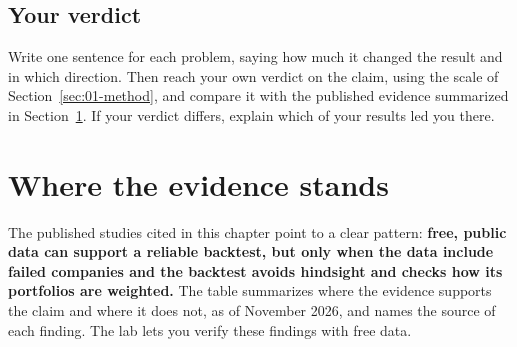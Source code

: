 \subsection*{Your verdict}

Write one sentence for each problem, saying how much it changed the result and in which direction. Then reach your own verdict on the claim, using the scale of Section~\ref{sec:01-method}, and compare it with the published evidence summarized in Section~\ref{sec:02-verdict}. If your verdict differs, explain which of your results led you there.

\section{Where the evidence stands}
\label{sec:02-verdict}

The published studies cited in this chapter point to a clear pattern: \textbf{free, public data can support a reliable backtest, but only when the data include failed companies and the backtest avoids hindsight and checks how its portfolios are weighted.} The table summarizes where the evidence supports the claim and where it does not, as of November 2026, and names the source of each finding. The lab lets you verify these findings with free data.

